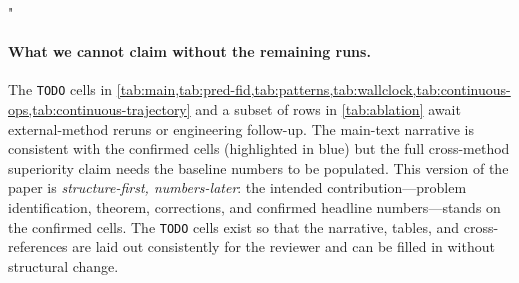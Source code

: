 "\documentclass{article}
\theoremstyle{plain}
\theoremstyle{definition}
\theoremstyle{remark}
\begin{document}
\paragraph{What we cannot claim without the remaining runs.}
The \texttt{TODO} cells in \cref{tab:main,tab:pred-fid,tab:patterns,tab:wallclock,tab:continuous-ops,tab:continuous-trajectory} and a subset of rows in \cref{tab:ablation} await external-method reruns or engineering follow-up. The main-text narrative is consistent with the confirmed cells (highlighted in blue) but the full cross-method superiority claim needs the baseline numbers to be populated. This version of the paper is \emph{structure-first, numbers-later}: the intended contribution---problem identification, theorem, corrections, and confirmed headline numbers---stands on the confirmed cells. The \texttt{TODO} cells exist so that the narrative, tables, and cross-references are laid out consistently for the reviewer and can be filled in without structural change.

\newpage

\end{document}
